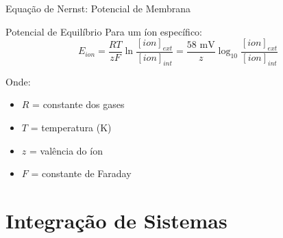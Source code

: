 \begin{frame}[allowframebreaks]{Equação de Nernst: Potencial de Membrana}
\begin{block}{Potencial de Equilíbrio}
Para um íon específico:
\begin{equation*}
E_{ion} = \frac{RT}{zF} \ln\frac{[ion]_{ext}}{[ion]_{int}} = \frac{58\text{ mV}}{z} \log_{10}\frac{[ion]_{ext}}{[ion]_{int}}
\end{equation*}

Onde:
\begin{itemize}
    \item $R$ = constante dos gases
    \item $T$ = temperatura (K)
    \item $z$ = valência do íon
    \item $F$ = constante de Faraday
\end{itemize}
\end{block}

\end{frame}

\section{Integração de Sistemas}

